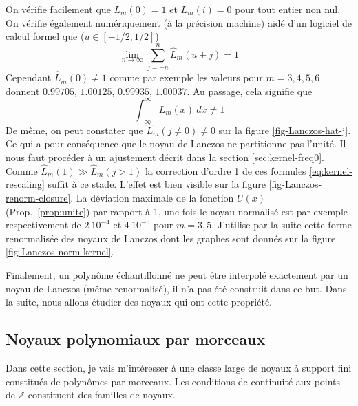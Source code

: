 \documentclass[11pt,twoside]{article}
\begin{document}
On vérifie facilement que $L_m(0)=1$ et $L_m(i)=0$ pour tout entier non nul. On vérifie également numériquement (à la précision machine) aidé d'un logiciel de calcul formel que ($u\in[-1/2,1/2]$)
\begin{equation}
\lim_{n\rightarrow \infty} \sum_{j=-n}^n \hat{L}_m(u+j)=1
\end{equation}
Cependant $\hat{L}_m(0)\neq 1$ comme par exemple les valeurs pour $m=3,4,5,6$ donnent $0.99705$, $1.00125$, $0.99935$, $1.00037$. Au passage, cela signifie que 
\begin{equation}
\int_{-\infty}^\infty L_m(x)\ dx \neq 1
\end{equation}
De même, on peut constater que $\hat{L}_m(j\neq0)\neq 0$ sur la figure \ref{fig-Lanczos-hat-j}. Ce qui a pour conséquence que le noyau de Lanczos ne partitionne pas l'unité. Il nous faut procéder à un ajustement décrit dans la section \ref{sec:kernel-freq0}. Comme $\hat{L}_m(1)\gg \hat{L}_m(j>1)$ la correction d'ordre 1 de ces formules \ref{eq:kernel-rescaling} suffit à ce stade. L'effet est bien visible sur la figure \ref{fig-Lanczos-renorm-closure}. La déviation maximale de la fonction $U(x)$ (Prop.~\ref{prop:unite})  par rapport à 1, une fois le noyau normalisé est par exemple respectivement de $2\ 10^{-4}$ et $4\ 10^{-5}$ pour $m=3,5$. J'utilise par la suite cette forme renormalisée des noyaux de Lanczos dont les graphes sont donnés sur la figure \ref{fig-Lanczos-norm-kernel}. 

Finalement, un polynôme échantillonné ne peut être interpolé exactement par un noyau de Lanczos (même renormalisé), il n'a pas été construit dans ce but. Dans la suite, nous allons étudier des noyaux  qui ont cette propriété.
%
\subsection{Noyaux polynomiaux par morceaux}
%
Dans cette section, je vais m'intéresser à une classe large de noyaux à support fini constitués de polynômes par morceaux. Les conditions de continuité aux points de $\mathbb{Z}$ constituent des familles de noyaux. 
%
\end{document}
